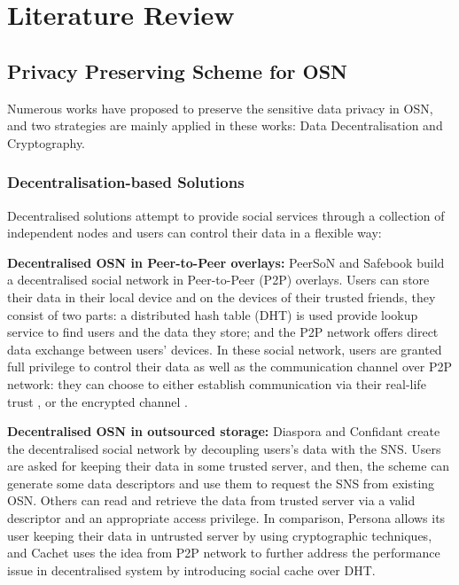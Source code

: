 \chapter{Literature Review}

\section{Privacy Preserving Scheme for OSN}
Numerous works have proposed to preserve the sensitive data privacy in OSN, and two strategies are mainly applied in these works: Data Decentralisation and Cryptography.

\subsection{Decentralisation-based Solutions}
Decentralised solutions attempt to provide social services through a collection of independent nodes and users can control their data in a flexible way:

{\bf Decentralised OSN in Peer-to-Peer overlays:} PeerSoN \cite{buchegger2009peerson} and Safebook \cite{cutillo2009safebook} build a decentralised social network in Peer-to-Peer (P2P) overlays. Users can store their data in their local device and on the devices of their trusted friends, they consist of two parts: a distributed hash table (DHT) is used provide lookup service to find users and the data they store; and the P2P network offers direct data exchange between users' devices. In these social network, users are granted full privilege to control their data as well as the communication channel over P2P network: they can choose to either establish communication via their real-life trust \cite{cutillo2009safebook}, or the encrypted channel \cite{buchegger2009peerson}.

{\bf Decentralised OSN in outsourced storage:} Diaspora \cite{diaspora2017diaspora} and Confidant \cite{liu2011confidant} create the decentralised social network by decoupling users's data with the SNS. Users are asked for keeping their data in some trusted server, and then, the scheme can generate some data descriptors and use them to request the SNS from existing OSN. Others can read and retrieve the data from trusted server via a valid descriptor and an appropriate access privilege. 
In comparison, Persona \cite{baden2009persona} allows its user keeping their data in untrusted server by using cryptographic techniques, and Cachet \cite{nilizadeh2012cachet} uses the idea from P2P network to further address the performance issue in decentralised system by introducing social cache over DHT.

